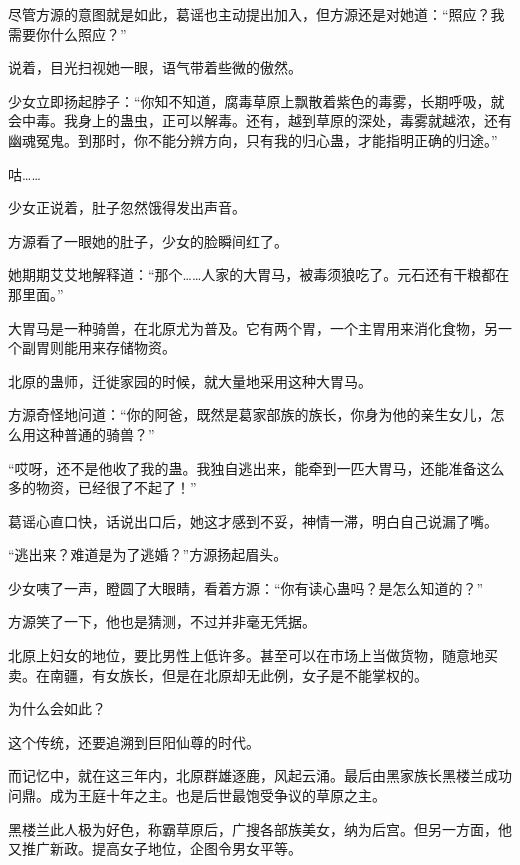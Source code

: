 
\begin{this_body}



尽管方源的意图就是如此，葛谣也主动提出加入，但方源还是对她道：“照应？我需要你什么照应？”

说着，目光扫视她一眼，语气带着些微的傲然。

少女立即扬起脖子：“你知不知道，腐毒草原上飘散着紫色的毒雾，长期呼吸，就会中毒。我身上的蛊虫，正可以解毒。还有，越到草原的深处，毒雾就越浓，还有幽魂冤鬼。到那时，你不能分辨方向，只有我的归心蛊，才能指明正确的归途。”

咕……

少女正说着，肚子忽然饿得发出声音。

方源看了一眼她的肚子，少女的脸瞬间红了。

她期期艾艾地解释道：“那个……人家的大胃马，被毒须狼吃了。元石还有干粮都在那里面。”

大胃马是一种骑兽，在北原尤为普及。它有两个胃，一个主胃用来消化食物，另一个副胃则能用来存储物资。

北原的蛊师，迁徙家园的时候，就大量地采用这种大胃马。

方源奇怪地问道：“你的阿爸，既然是葛家部族的族长，你身为他的亲生女儿，怎么用这种普通的骑兽？”

“哎呀，还不是他收了我的蛊。我独自逃出来，能牵到一匹大胃马，还能准备这么多的物资，已经很了不起了！”

葛谣心直口快，话说出口后，她这才感到不妥，神情一滞，明白自己说漏了嘴。

“逃出来？难道是为了逃婚？”方源扬起眉头。

少女咦了一声，瞪圆了大眼睛，看着方源：“你有读心蛊吗？是怎么知道的？”

方源笑了一下，他也是猜测，不过并非毫无凭据。

北原上妇女的地位，要比男性上低许多。甚至可以在市场上当做货物，随意地买卖。在南疆，有女族长，但是在北原却无此例，女子是不能掌权的。

为什么会如此？

这个传统，还要追溯到巨阳仙尊的时代。

而记忆中，就在这三年内，北原群雄逐鹿，风起云涌。最后由黑家族长黑楼兰成功问鼎。成为王庭十年之主。也是后世最饱受争议的草原之主。

黑楼兰此人极为好色，称霸草原后，广搜各部族美女，纳为后宫。但另一方面，他又推广新政。提高女子地位，企图令男女平等。


\end{this_body}
